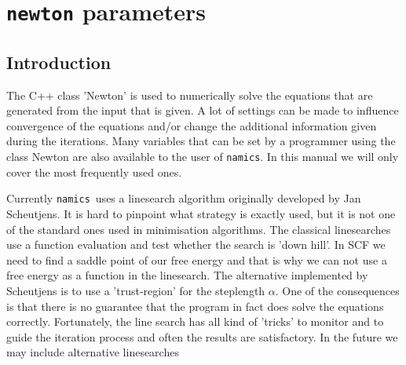 \documentclass{article}
\newcommand{\namics}{{\tt namics}}
\begin{document}




\section{{\tt newton} parameters}
\label{sec:newton}

\subsection{Introduction}
The C++ class 'Newton' is used to numerically solve the equations that are generated from the input that is given.  A lot of settings can be made to influence convergence of the equations and/or change the additional information given during the iterations.  Many variables that can be set by a programmer using the class Newton are also available to the user of \namics. In this manual we will only cover the most frequently used ones.

Currently \namics\ uses a linesearch algorithm originally developed by Jan Scheutjens. It is hard to pinpoint what strategy is exactly used, but it is not one of the standard ones used in minimisation algorithms. The classical linesearches use a function evaluation and test whether the search is 'down hill'. In SCF we need to find a saddle point of our free energy and that is why we can not use a free energy as a function in the linesearch. The alternative implemented by Scheutjens is to use a  'trust-region' for the steplength $\alpha$. One of the consequences is that there is no guarantee that the program in fact does solve the equations correctly. Fortunately, the line search has all kind of 'tricks' to monitor and to guide the iteration process and often the results are satisfactory. In the future we may include alternative linesearches
\end{document}
